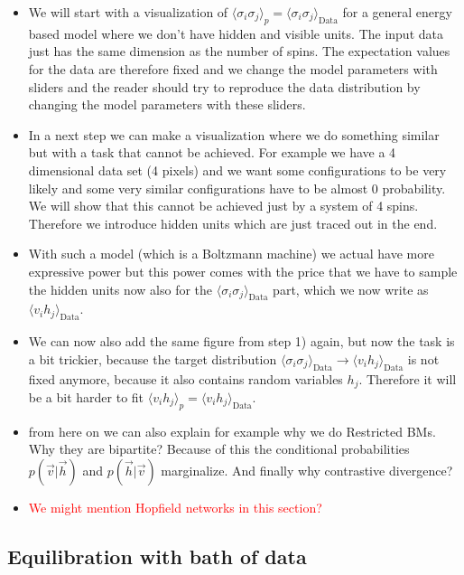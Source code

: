 \documentclass[nofootinbib, superscriptaddress, prl]{revtex4}
\begin{document}
\begin{itemize}
	\item We will start with a visualization of  $\langle \sigma_i \sigma_j \rangle_p = \langle \sigma_i \sigma_j \rangle_{\text{Data}}$ for a general energy based model where we don't have hidden and visible units. The input data just has the same dimension as the number of spins. The expectation values for the data are therefore fixed and we change the model parameters with sliders and the reader should try to reproduce the data distribution by changing the model parameters with these sliders.
	\item In a next step we can make a visualization where we do something similar but with a task that cannot be achieved. For example we have a 4 dimensional data set (4 pixels) and we want some configurations to be very likely and some very similar configurations have to be almost 0 probability. We will show that this cannot be achieved just by a system of 4 spins. Therefore we introduce hidden units which are just traced out in the end.
	\item With such a model (which is a Boltzmann machine) we actual have more expressive power but this power comes with the price that we have to sample the hidden units now also for the $\langle \sigma_i \sigma_j \rangle_{\text{Data}}$ part, which we now write as $\langle v_i h_j \rangle_{\text{Data}}$.
	\item We can now also add the same figure from step 1) again, but now the task is a bit trickier, because the target distribution $\langle \sigma_i \sigma_j \rangle_{\text{Data}} \rightarrow \langle v_i h_j \rangle_{\text{Data}}$ is not fixed anymore, because it also contains random variables $h_j$. Therefore it will be a bit harder to fit $\langle v_i h_j \rangle_p = \langle v_i h_j \rangle_{\text{Data}}$.
	\item from here on we can also explain for example why we do Restricted BMs. Why they are bipartite? Because of this the conditional probabilities $p(\vec{v} | \vec{h})$ and $p(\vec{h} | \vec{v})$ marginalize. And finally why contrastive divergence?
	\item \textcolor{red}{We might mention Hopfield networks in this section?}
\end{itemize}

\subsection{Equilibration with bath of data}
\end{document}
